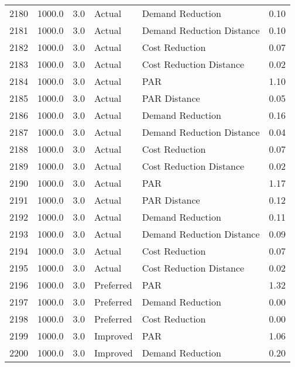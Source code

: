 \begin{longtable}{lrrllr}
2180 &       1000.0 &     3.0 &         Actual &           Demand Reduction &   0.10 \\
2181 &       1000.0 &     3.0 &         Actual &  Demand Reduction Distance &   0.10 \\
2182 &       1000.0 &     3.0 &         Actual &             Cost Reduction &   0.07 \\
2183 &       1000.0 &     3.0 &         Actual &    Cost Reduction Distance &   0.02 \\
2184 &       1000.0 &     3.0 &         Actual &                        PAR &   1.10 \\
2185 &       1000.0 &     3.0 &         Actual &               PAR Distance &   0.05 \\
2186 &       1000.0 &     3.0 &         Actual &           Demand Reduction &   0.16 \\
2187 &       1000.0 &     3.0 &         Actual &  Demand Reduction Distance &   0.04 \\
2188 &       1000.0 &     3.0 &         Actual &             Cost Reduction &   0.07 \\
2189 &       1000.0 &     3.0 &         Actual &    Cost Reduction Distance &   0.02 \\
2190 &       1000.0 &     3.0 &         Actual &                        PAR &   1.17 \\
2191 &       1000.0 &     3.0 &         Actual &               PAR Distance &   0.12 \\
2192 &       1000.0 &     3.0 &         Actual &           Demand Reduction &   0.11 \\
2193 &       1000.0 &     3.0 &         Actual &  Demand Reduction Distance &   0.09 \\
2194 &       1000.0 &     3.0 &         Actual &             Cost Reduction &   0.07 \\
2195 &       1000.0 &     3.0 &         Actual &    Cost Reduction Distance &   0.02 \\
2196 &       1000.0 &     3.0 &      Preferred &                        PAR &   1.32 \\
2197 &       1000.0 &     3.0 &      Preferred &           Demand Reduction &   0.00 \\
2198 &       1000.0 &     3.0 &      Preferred &             Cost Reduction &   0.00 \\
2199 &       1000.0 &     3.0 &       Improved &                        PAR &   1.06 \\
2200 &       1000.0 &     3.0 &       Improved &           Demand Reduction &   0.20 \\

\end{longtable}
